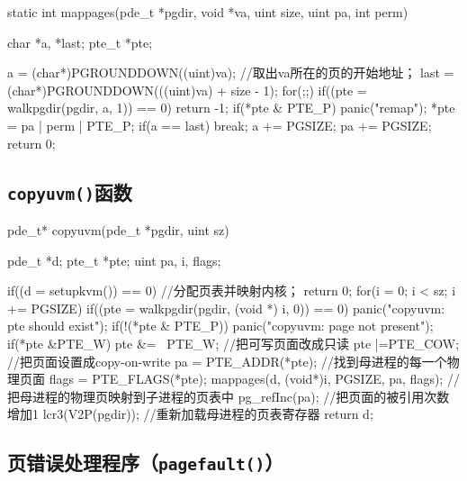 \documentclass{swfcthesismscctex}
\begin{document}
\begin{ccode}
static int
mappages(pde_t *pgdir, void *va, uint size, uint pa, int perm)
{
  char *a, *last;
  pte_t *pte;

  a = (char*)PGROUNDDOWN((uint)va); //取出va所在的页的开始地址；
  last = (char*)PGROUNDDOWN(((uint)va) + size - 1); 
  for(;;){
    if((pte = walkpgdir(pgdir, a, 1)) == 0)
      return -1;
    if(*pte & PTE_P)
      panic("remap");
    *pte = pa | perm | PTE_P;
    if(a == last)
      break;
    a += PGSIZE;
    pa += PGSIZE;
  }
  return 0;
}
\end{ccode}

\subsection{\texttt{copyuvm()}函数}
\label{sec:copyuvm}

\begin{ccode}
pde_t* copyuvm(pde_t *pgdir, uint sz)
{
  pde_t *d;
  pte_t *pte;
  uint pa, i, flags;

  if((d = setupkvm()) == 0) //分配页表并映射内核；
    return 0;
  for(i = 0; i < sz; i += PGSIZE){
    if((pte = walkpgdir(pgdir, (void *) i, 0)) == 0)
      panic("copyuvm: pte should exist");
    if(!(*pte & PTE_P))
      panic("copyuvm: page not present");
    if(*pte &PTE_W) {
      pte &= ~PTE_W; //把可写页面改成只读
      pte |=PTE_COW; //把页面设置成copy-on-write
    }
    pa = PTE_ADDR(*pte); //找到母进程的每一个物理页面
    flags = PTE_FLAGS(*pte);
    mappages(d, (void*)i, PGSIZE, pa, flags); //把母进程的物理页映射到子进程的页表中
    pg_refInc(pa);  //把页面的被引用次数增加1
  }
  lcr3(V2P(pgdir)); //重新加载母进程的页表寄存器
  return d;
}
\end{ccode}

\subsection{页错误处理程序（\texttt{pagefault()}）}
\label{sec:page-fault}
\end{document}
